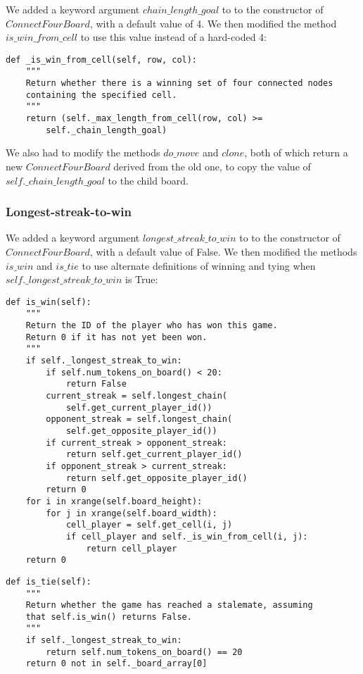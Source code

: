 \documentclass[11pt]{article}
\begin{document}
We added a keyword argument \(chain\_length\_goal\) to to the constructor of
\(ConnectFourBoard\), with a default value of 4. We then modified the method
\(is\_win\_from\_cell\) to use this value instead of a hard-coded 4:

\lstset{language=Python}
\begin{lstlisting}[frame=single]
def _is_win_from_cell(self, row, col):
	"""
	Return whether there is a winning set of four connected nodes
	containing the specified cell.
	"""
	return (self._max_length_from_cell(row, col) >=
		self._chain_length_goal)
\end{lstlisting}

We also had to modify the methods \(do\_move\) and \(clone\), both of which
return a new \(ConnectFourBoard\) derived from the old one, to copy the value
of \(self.\_chain\_length\_goal\) to the child board.

\subsubsection{Longest-streak-to-win}

We added a keyword argument \(longest\_streak\_to\_win\) to to the
constructor of \(ConnectFourBoard\), with a default value of False. We then
modified the methods \(is\_win\) and \(is\_tie\) to use alternate definitions
of winning and tying when \(self.\_longest\_streak\_to\_win\) is True:

\lstset{language=Python}
\begin{lstlisting}[frame=single]
def is_win(self):
	"""
	Return the ID of the player who has won this game.
	Return 0 if it has not yet been won.
	"""
	if self._longest_streak_to_win:
		if self.num_tokens_on_board() < 20:
			return False
		current_streak = self.longest_chain(
			self.get_current_player_id())
		opponent_streak = self.longest_chain(
			self.get_opposite_player_id())
		if current_streak > opponent_streak:
			return self.get_current_player_id()
		if opponent_streak > current_streak:
			return self.get_opposite_player_id()
		return 0
	for i in xrange(self.board_height):
		for j in xrange(self.board_width):
			cell_player = self.get_cell(i, j)
			if cell_player and self._is_win_from_cell(i, j):
				return cell_player
	return 0
\end{lstlisting}

\lstset{language=Python}
\begin{lstlisting}[frame=single]
def is_tie(self):
	"""
	Return whether the game has reached a stalemate, assuming
	that self.is_win() returns False.
	"""
	if self._longest_streak_to_win:
		return self.num_tokens_on_board() == 20
	return 0 not in self._board_array[0]
\end{lstlisting}
\end{document}
